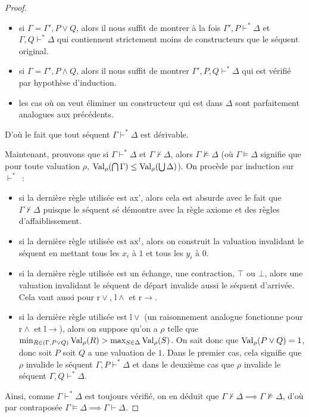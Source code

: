 \begin{proof}
\begin{itemize}
  \item si $\Gamma = \Gamma', P\lor Q$, alors il nous suffit de montrer
    à la fois $\Gamma', P\vdash^* \Delta$ et $\Gamma,Q\vdash^*\Delta$ qui
    contiennent strictement moins de constructeurs que le séquent original.
  \item si $\Gamma = \Gamma', P\land Q$, alors il nous suffit de
    montrer $\Gamma', P,Q \vdash^* \Delta$ qui est vérifié par hypothèse
    d'induction.
  \item les cas où on veut éliminer un constructeur qui est dans $\Delta$
    sont parfaitement analogues aux précédents.
  \end{itemize}
  D'où le fait que tout séquent $\Gamma\vdash^* \Delta$ est dérivable.

  Maintenant, prouvons que si $\Gamma\vdash^*\Delta$ et $\Gamma\nvdash\Delta$,
  alors $\Gamma\nvDash\Delta$ (où $\Gamma\vDash \Delta$ signifie que pour toute
  valuation
  $\rho$, $\operatorname{Val}_\rho(\bigcap \Gamma) \leq \operatorname{Val}_\rho(\bigcup \Delta)$).
  On procède par induction sur $\vdash^*$~:
  \begin{itemize}
  \item si la dernière règle utilisée est ax', alors cela est absurde avec le
    fait que $\Gamma\nvdash \Delta$ puisque le séquent sé démontre avec la règle
    axiome et des règles d'affaiblissement.
  \item si la dernière règle utilisée est $\mathrm{ax}^\dagger$, alors on
    construit la valuation invalidant le séquent en mettant tous les $x_i$ à
    $1$ et tous les $y_i$ à $0$.
  \item si la dernière règle utilisée est un échange, une contraction, $\top$
    ou $\bot$, alors une valuation invalidant le séquent de départ invalide
    aussi le séquent d'arrivée. Cela vaut aussi pour $\mathrm{r}\lor$,
    $\mathrm{l}\land$ et $\mathrm{r}\to$.
  \item si la dernière règle utilisée est $\mathrm{l}\lor$ (un raisonnement
    analogue fonctionne pour $\mathrm{r}\land$ et $\mathrm{l}\to$), alors
    on suppose qu'on a $\rho$ telle que
    $\min_{R\in (\Gamma,P\lor Q)}\operatorname{Val}_\rho(R)>\max_{S\in \Delta}\operatorname{Val}_\rho(S)$. On sait
    donc que $\operatorname{Val}_\rho(P\lor Q) = 1$, donc soit $P$ soit $Q$ a une valuation
    de $1$. Dans le premier cas, cela signifie que $\rho$ invalide le
    séquent $\Gamma,P\vdash^* \Delta$ et dans le deuxième cas que $\rho$
    invalide le séquent $\Gamma,Q\vdash^* \Delta$.
  \end{itemize}

  Ainsi, comme $\Gamma\vdash^*\Delta$ est toujours vérifié, on en déduit que
  $\Gamma\nvdash\Delta\implies\Gamma\nvDash\Delta$, d'où par contraposée
  $\Gamma\vDash\Delta\implies\Gamma\vdash\Delta$.
\end{proof}

